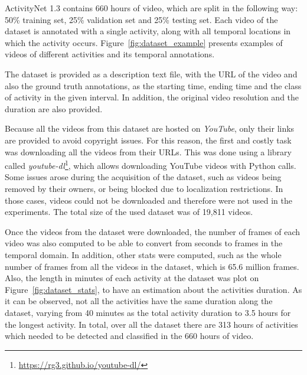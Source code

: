 ActivityNet 1.3 contains 660 hours of video, which are split in the following way: 50\% training set, 25\% validation set and 25\% testing set. Each video of the dataset is annotated with a single activity, along with all temporal locations in which the activity occurs. Figure~\ref{fig:dataset_example} presents examples of videos of different activities and its temporal annotations.

The dataset is provided as a description text file, with the URL of the video and also the ground truth annotations, as the starting time, ending time and the class of activity in the  given interval. In addition, the original video resolution and the duration are also provided.

Because all the videos from this dataset are hosted on \textit{YouTube}, only their links are provided to avoid copyright issues. For this reason, the first and costly task was downloading all the videos from their URLs. This was done using a library called \textit{youtube-dl}\footnote{\url{https://rg3.github.io/youtube-dl/}}, which allows downloading YouTube videos with Python calls. Some issues arose during the acquisition of the dataset, such as videos being removed by their owners, or being blocked due to localization restrictions. In those cases, videos could not be downloaded and therefore were not used in the experiments. The total size of the used dataset was of 19,811 videos.


Once the videos from the dataset were downloaded, the number of frames of each video was also computed to be able to convert from seconds to frames in the temporal domain.
In addition, other stats were computed, such as the whole number of frames from all the videos in the dataset, which is 65.6 million frames. Also, the length in minutes of each activity at the dataset was plot on Figure~\ref{fig:dataset_stats}, to have an estimation about the activities duration. As it can be observed, not all the activities have the same duration along the dataset, varying from 40 minutes as the total activity duration
to 3.5 hours for the longest activity. In total, over all the dataset there are 313 hours of activities which needed to be detected and classified in the 660 hours of video.


